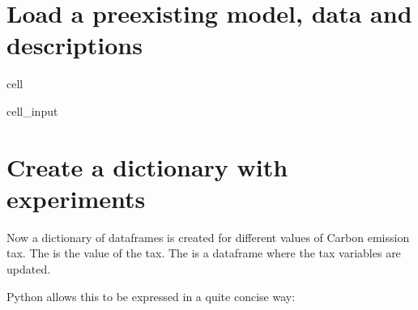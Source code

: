 \documentclass[letterpaper,10pt,english]{jupyterBook}
\begin{document}
\section{Load a pre\sphinxhyphen{}existing model, data and descriptions}
\label{\detokenize{content/howto/experiments/create_save_scenarios:load-a-pre-existing-model-data-and-descriptions}}
\begin{sphinxuseclass}{cell}\begin{sphinxVerbatimInput}

\begin{sphinxuseclass}{cell_input}
\begin{sphinxVerbatim}[commandchars=\\\{\}]
  
\end{sphinxVerbatim}

\end{sphinxuseclass}\end{sphinxVerbatimInput}

\end{sphinxuseclass}

\section{Create a dictionary with experiments}
\label{\detokenize{content/howto/experiments/create_save_scenarios:create-a-dictionary-with-experiments}}
\sphinxAtStartPar
Now a dictionary of dataframes is created for different values of Carbon emission tax. The  is the value of the tax. The  is a dataframe where the tax variables are updated.

\sphinxAtStartPar
Python allows this to be expressed in a quite concise way:
\end{document}
